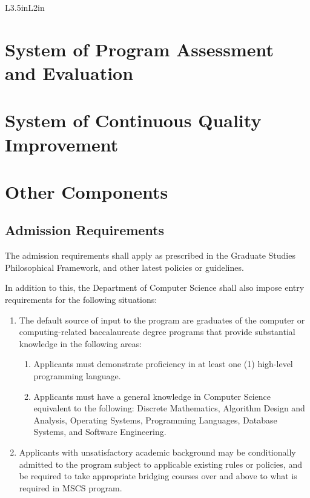 \documentclass[11pt,a4paper]{article}
\begin{document}
\begin{enumerate}
\begin{tabular}{L{3.5in}L{2in}}
\hline
\end{tabular}

\end{enumerate}

\section{System of Program Assessment and Evaluation}


\section{System of Continuous Quality Improvement}



\newpage
\section{Other Components}

\subsection{Admission Requirements}

The admission requirements shall apply as prescribed in the Graduate Studies Philosophical Framework, and other latest policies or guidelines.

In addition to this, the Department of Computer Science shall also impose entry requirements for the following situations:
\begin{enumerate}
\item The default source of input to the program are graduates of the computer or computing-related baccalaureate degree programs that provide substantial knowledge in the following areas:
\begin{enumerate}
\item Applicants must demonstrate proficiency in at least one (1) high-level programming language.
\item Applicants must have a general knowledge in Computer Science equivalent to the following: Discrete Mathematics, Algorithm Design and Analysis, Operating Systems, Programming Languages, Database Systems, and Software Engineering.
\end{enumerate}

\item Applicants with unsatisfactory academic background may be conditionally admitted to the program subject to applicable existing rules or policies, and be required to take appropriate bridging courses over and above to what is required in MSCS program.
\end{enumerate}
\end{document}
